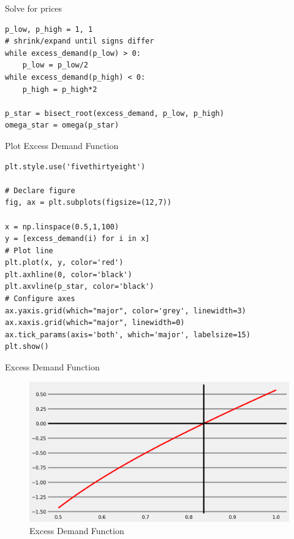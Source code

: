 \documentclass[notes,11pt, aspectratio=169, xcolor=table]{beamer}
\begin{document}
\begin{frame}[fragile=singleslide]{Solve for prices}
    \begin{verbatim}
p_low, p_high = 1, 1
# shrink/expand until signs differ
while excess_demand(p_low) > 0:
    p_low = p_low/2
while excess_demand(p_high) < 0:
    p_high = p_high*2

p_star = bisect_root(excess_demand, p_low, p_high)
omega_star = omega(p_star)
    \end{verbatim}
\end{frame}



\begin{frame}[fragile=singleslide]{Plot Excess Demand Function}
    \begin{verbatim}
plt.style.use('fivethirtyeight')

# Declare figure
fig, ax = plt.subplots(figsize=(12,7))

x = np.linspace(0.5,1,100)
y = [excess_demand(i) for i in x]
# Plot line
plt.plot(x, y, color='red')
plt.axhline(0, color='black')
plt.axvline(p_star, color='black')
# Configure axes
ax.yaxis.grid(which="major", color='grey', linewidth=3)
ax.xaxis.grid(which="major", linewidth=0)
ax.tick_params(axis='both', which='major', labelsize=15)
plt.show()
    \end{verbatim}
\end{frame}

\begin{frame}{Excess Demand Function}
\begin{figure}
    \centering
    \includegraphics[width=0.75\linewidth]{figs/ed.png}
    \caption{Excess Demand Function}
    \label{fig:ed}
\end{figure}
\end{frame}
\end{document}
